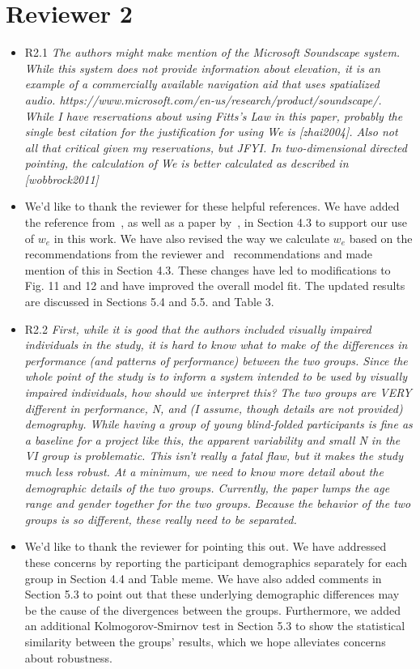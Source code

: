 \documentclass{scrartcl}
\begin{document}
\section*{Reviewer 2}


\begin{itemize}

  \item R2.1 \textit{The authors might make mention of the Microsoft Soundscape system. While this system does not provide information about elevation, it is an example of a commercially available navigation aid that uses spatialized audio. https://www.microsoft.com/en-us/research/product/soundscape/. While I have reservations about using Fitts’s Law in this paper, probably the single best citation for the justification for using We is [zhai2004]. Also not all that critical given my reservations, but JFYI. In two-dimensional directed pointing, the calculation of We is better calculated as described in [wobbrock2011]}
  \item[] We'd like to thank the reviewer for these helpful references. 
    We have added the reference from~\cite{zhai2004speed}, as well as a paper by~\cite{kabbash1995prince}, in Section 4.3 to support our use of $w_e$ in this work.
    We have also revised the way we calculate $w_e$ based on the recommendations from the reviewer and~\cite{wobbrock2011effects} recommendations and made mention of this in Section 4.3. 
    These changes have led to modifications to Fig. 11 and 12 and have improved the overall model fit.
    The updated results are discussed in Sections 5.4 and 5.5. and Table 3.
    
  \item R2.2 \textit{First, while it is good that the authors included visually impaired individuals in the study, it is hard to know what to make of the differences in performance (and patterns of performance) between the two groups. Since the whole point of the study is to inform a system intended to be used by visually impaired individuals, how should we interpret this? The two groups are VERY different in performance, N, and (I assume, though details are not provided) demography. While having a group of young blind-folded participants is fine as a baseline for a project like this, the apparent variability and small N in the VI group is problematic. This isn’t really a fatal flaw, but it makes the study much less robust. At a minimum, we need to know more detail about the demographic details of the two groups. Currently, the paper lumps the age range and gender together for the two groups. Because the behavior of the two groups is so different, these really need to be separated.}
  \item[] We'd like to thank the reviewer for pointing this out. 
    We have addressed these concerns by reporting the participant demographics separately for each group in Section 4.4 and Table meme. 
    We have also added comments in Section 5.3 to point out that these underlying demographic differences may be the cause of the divergences between the groups.  
    Furthermore, we added an additional Kolmogorov-Smirnov test in Section 5.3 to show the statistical similarity between the groups' results, which we hope alleviates concerns about robustness.


\end{itemize}
\end{document}
